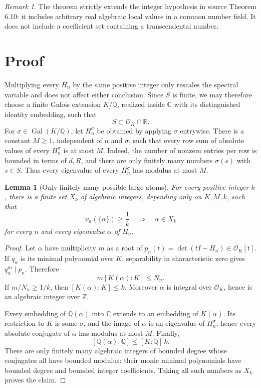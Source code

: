 \documentclass[11pt]{article}
\newtheorem{lemma}{Lemma}
\theoremstyle{definition}
\theoremstyle{remark}
\newtheorem{remark}{Remark}
\newcommand{\Q}{\mathbb{Q}}
\newcommand{\R}{\mathbb{R}}
\newcommand{\OK}{\mathcal{O}_K}
\newcommand{\Gal}{\operatorname{Gal}}
\begin{document}
\begin{remark}
The theorem strictly extends the integer hypothesis in source Theorem 6.10:
it includes arbitrary real algebraic local values in a common number field.
It does not include a coefficient set containing a transcendental number.
\end{remark}

\section{Proof}

Multiplying every $H_n$ by the same positive integer only rescales the
spectral variable and does not affect either conclusion.  Since $S$ is
finite, we may therefore choose a finite Galois extension $K/\Q$, realized
inside $\mathbb C$ with its distinguished identity embedding, such that
\[
                       S\subset\OK\cap\R .
\]
For $\sigma\in\Gal(K/\Q)$, let $H_n^\sigma$ be obtained by applying $\sigma$
entrywise.  There is a constant $M\ge1$, independent of $n$ and $\sigma$,
such that every row sum of absolute values of every $H_n^\sigma$ is at most
$M$.  Indeed, the number of nonzero entries per row is bounded in terms of
$d,R$, and there are only finitely many numbers $\sigma(s)$ with
$s\in S$.  Thus every eigenvalue of every $H_n^\sigma$ has modulus at most
$M$.

\begin{lemma}[Only finitely many possible large atoms]
\label{lem:finite}
For every positive integer $k$, there is a finite set $X_k$ of algebraic
integers, depending only on $K,M,k$, such that
\[
       \nu_n(\{\alpha\})\ge \frac1k
       \quad\Longrightarrow\quad
       \alpha\in X_k
\]
for every $n$ and every eigenvalue $\alpha$ of $H_n$.
\end{lemma}

\begin{proof}
Let $\alpha$ have multiplicity $m$ as a root of
$p_n(t)=\det(tI-H_n)\in\OK[t]$.  If $q_\alpha$ is its minimal polynomial over
$K$, separability in characteristic zero gives $q_\alpha^m\mid p_n$.
Therefore
\[
        m[K(\alpha):K]\le N_n.
\]
If $m/N_n\ge1/k$, then $[K(\alpha):K]\le k$.  Moreover $\alpha$ is integral
over $\OK$, hence is an algebraic integer over $\mathbb Z$.

Every embedding of $\Q(\alpha)$ into $\mathbb C$ extends to an embedding of
$K(\alpha)$.  Its restriction to $K$ is some $\sigma$, and the image of
$\alpha$ is an eigenvalue of $H_n^\sigma$; hence every absolute conjugate of
$\alpha$ has modulus at most $M$.  Finally,
\[
             [\Q(\alpha):\Q]\le [K:\Q]\,k.
\]
There are only finitely many algebraic integers of bounded degree whose
conjugates all have bounded modulus: their monic minimal polynomials have
bounded degree and bounded integer coefficients.  Taking all such numbers as
$X_k$ proves the claim.
\end{proof}
\end{document}
